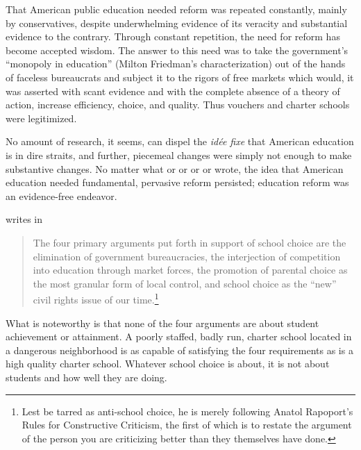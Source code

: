 That American public education needed reform was repeated constantly, mainly by conservatives, despite underwhelming evidence of its veracity and substantial evidence to the contrary. Through constant repetition, the need for reform has become accepted wisdom. The answer to this need was to take the government's ``monopoly in education'' (Milton Friedman's characterization) out of the hands of faceless bureaucrats and subject it to the rigors of free markets which would, it was asserted with scant evidence and with the complete absence of a theory of action, increase efficiency, choice, and quality. Thus vouchers and charter schools were legitimized.

No amount of research, it seems, can dispel the \textit{idée fixe} that American education is in dire straits, and further, piecemeal changes were simply not enough to make substantive changes. No matter what \textcite{Henig1994} or \textcite{Berliner.Biddle1997} or \textcite{Nichols.etal2007} or \textcite{Glass2008} or \textcite{Berliner.Glass2014} wrote, the idea that American education needed fundamental, pervasive reform persisted; education reform was an evidence-free endeavor.

\citeauthor{Garcia2018} writes in 
\blockquote[{\parencite[55]{Garcia2018}}]{\SingleSpacing\vspace{-0.5\baselineskip}%
The four primary arguments put forth in support of school choice are the elimination of government bureaucracies, the interjection of competition into education through market forces, the promotion of parental choice as the most granular form of local control, and school choice as the ``new'' civil rights issue of our time.\footnote{Lest \citeauthor{Garcia2018} be tarred as anti-school choice, he is merely following Anatol Rapoport's Rules for Constructive Criticism, the first of which is to restate the argument of the person you are criticizing better than they themselves have done.}} What is noteworthy is that none of the four arguments are about student achievement or attainment. A poorly staffed, badly run, charter school located in a dangerous neighborhood is as capable of satisfying the four requirements as is a high quality charter school. Whatever school choice is about, it is not about students and how well they are doing.

